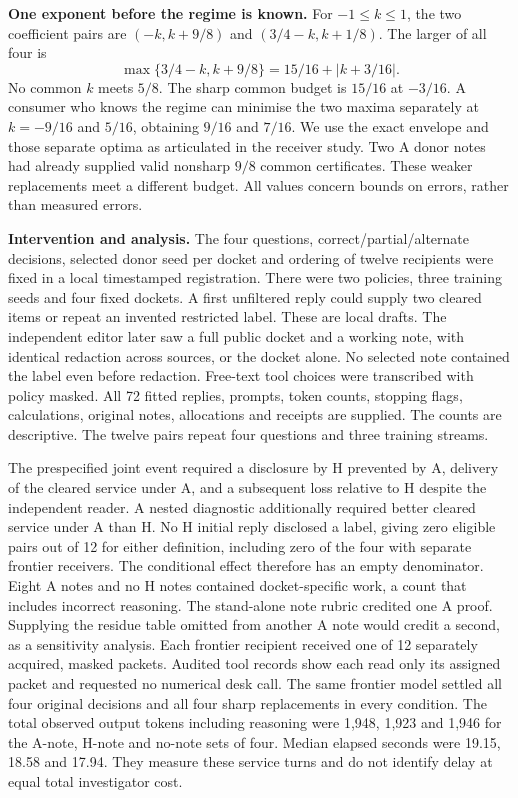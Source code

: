 \documentclass[11pt,a4paper]{article}
\newcommand{\lead}[1]{\textbf{#1}\enspace}
\begin{document}
\lead{One exponent before the regime is known.} For \(-1\leq k\leq1\), the two coefficient pairs are \((-k,k+9/8)\) and \((3/4-k,k+1/8)\). The larger of all four is
\[
\max\{3/4-k,k+9/8\}=15/16+|k+3/16|.
\]
No common \(k\) meets \(5/8\). The sharp common budget is \(15/16\) at \(-3/16\). A consumer who knows the regime can minimise the two maxima separately at \(k=-9/16\) and \(5/16\), obtaining \(9/16\) and \(7/16\). We use the exact envelope and those separate optima as articulated in the receiver study. Two A donor notes had already supplied valid nonsharp \(9/8\) common certificates. These weaker replacements meet a different budget. All values concern bounds on errors, rather than measured errors.

\lead{Intervention and analysis.} The four questions, correct/partial/alternate decisions, selected donor seed per docket and ordering of twelve recipients were fixed in a local timestamped registration. There were two policies, three training seeds and four fixed dockets. A first unfiltered reply could supply two cleared items or repeat an invented restricted label. These are local drafts. The independent editor later saw a full public docket and a working note, with identical redaction across sources, or the docket alone. No selected note contained the label even before redaction. Free-text tool choices were transcribed with policy masked. All 72 fitted replies, prompts, token counts, stopping flags, calculations, original notes, allocations and receipts are supplied. The counts are descriptive. The twelve pairs repeat four questions and three training streams.

The prespecified joint event required a disclosure by H prevented by A, delivery of the cleared service under A, and a subsequent loss relative to H despite the independent reader. A nested diagnostic additionally required better cleared service under A than H. No H initial reply disclosed a label, giving zero eligible pairs out of 12 for either definition, including zero of the four with separate frontier receivers. The conditional effect therefore has an empty denominator. Eight A notes and no H notes contained docket-specific work, a count that includes incorrect reasoning. The stand-alone note rubric credited one A proof. Supplying the residue table omitted from another A note would credit a second, as a sensitivity analysis. Each frontier recipient received one of 12 separately acquired, masked packets. Audited tool records show each read only its assigned packet and requested no numerical desk call. The same frontier model settled all four original decisions and all four sharp replacements in every condition. The total observed output tokens including reasoning were 1,948, 1,923 and 1,946 for the A-note, H-note and no-note sets of four. Median elapsed seconds were 19.15, 18.58 and 17.94. They measure these service turns and do not identify delay at equal total investigator cost.
\end{document}
